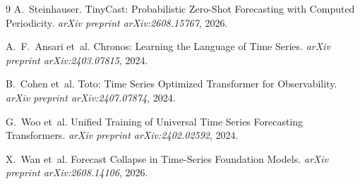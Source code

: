 \documentclass[11pt,a4paper]{article}
\begin{document}
\begin{thebibliography}{9}
A.~Steinhauser.
\newblock TinyCast: Probabilistic Zero-Shot Forecasting with Computed Periodicity.
\newblock \emph{arXiv preprint arXiv:2608.15767}, 2026.

A.~F.~Ansari et~al.
\newblock Chronos: Learning the Language of Time Series.
\newblock \emph{arXiv preprint arXiv:2403.07815}, 2024.

B.~Cohen et~al.
\newblock Toto: Time Series Optimized Transformer for Observability.
\newblock \emph{arXiv preprint arXiv:2407.07874}, 2024.

G.~Woo et~al.
\newblock Unified Training of Universal Time Series Forecasting Transformers.
\newblock \emph{arXiv preprint arXiv:2402.02592}, 2024.

X.~Wan et~al.
\newblock Forecast Collapse in Time-Series Foundation Models.
\newblock \emph{arXiv preprint arXiv:2608.14106}, 2026.
\end{thebibliography}
\end{document}
